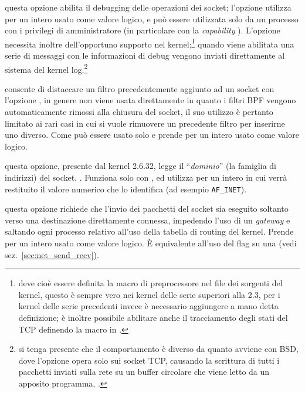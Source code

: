 \begin{basedescript}{\desclabelwidth{2.2cm}\desclabelstyle{\nextlinelabel}}
\item[\constd{SO\_DEBUG}] questa opzione abilita il debugging delle operazioni
  dei socket; l'opzione utilizza per  un intero usato come
  valore logico, e può essere utilizzata solo da un processo con i privilegi
  di amministratore (in particolare con la \textit{capability}
  ).  L'opzione necessita inoltre dell'opportuno
  supporto nel kernel;\footnote{deve cioè essere definita la macro di
    preprocessore  nel file 
    dei sorgenti del kernel, questo è sempre vero nei kernel delle serie
    superiori alla 2.3, per i kernel delle serie precedenti invece è
    necessario aggiungere a mano detta definizione; è inoltre possibile
    abilitare anche il tracciamento degli stati del TCP definendo la macro
     in .}  quando viene
  abilitata una serie di messaggi con le informazioni di debug vengono inviati
  direttamente al sistema del kernel log.\footnote{si tenga presente che il
    comportamento è diverso da quanto avviene con BSD, dove l'opzione opera
    solo sui socket TCP, causando la scrittura di tutti i pacchetti inviati
    sulla rete su un buffer circolare che viene letto da un apposito
    programma, .}

\item[\constd{SO\_DETACH\_FILTER}] consente di distaccare un filtro
  precedentemente aggiunto ad un socket con l'opzione
  , in genere non viene usata direttamente in quanto
  i filtri BPF vengono automaticamente rimossi alla chiusura del socket, il
  suo utilizzo è pertanto limitato ai rari casi in cui si vuole rimuovere un
  precedente filtro per inserirne uno diverso. Come 
  può essere usato solo  e prende per  un
  intero usato come valore logico.

\item[\constd{SO\_DOMAIN}] questa opzione, presente dal kernel 2.6.32, legge
  il ``\textsl{dominio}'' (la famiglia di indirizzi) del socket.
. Funziona solo con , ed
  utilizza per  un intero in cui verrà restituito il valore
  numerico che lo identifica (ad esempio \texttt{AF\_INET}).

\item[\constd{SO\_DONTROUTE}] questa opzione richiede che l'invio dei
  pacchetti del socket sia eseguito soltanto verso una destinazione
  direttamente connessa, impedendo l'uso di un \textit{gateway} e saltando
  ogni processo relativo all'uso della tabella di routing del kernel. Prende
  per  un intero usato come valore logico. È equivalente all'uso
  del flag  su una  (vedi
  sez.~\ref{sec:net_send_recv}).


\end{basedescript}
